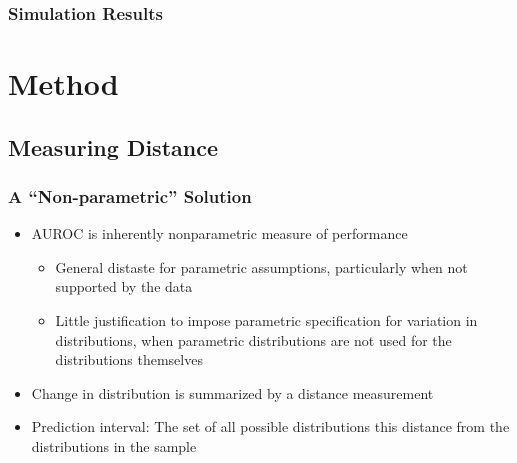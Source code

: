 \documentclass{beamer}
\begin{document}

\begin{frame}
\frametitle{Simulation Results}




\end{frame}




\section{Method}
\subsection{Measuring Distance}



\begin{frame}
\frametitle{A ``Non-parametric'' Solution}


\begin{itemize}
    \item AUROC is inherently nonparametric measure of performance
    \begin{itemize}
        \item General distaste for parametric assumptions, particularly when not supported by the data
        \item Little justification to impose parametric specification for variation in distributions, when parametric distributions are not used for the distributions themselves
    \end{itemize}
    \item Change in distribution is summarized by a distance measurement
    \item Prediction interval: The set of all possible distributions this distance from the distributions in the sample
\end{itemize}

\end{frame}

\end{document}
